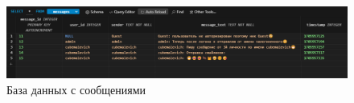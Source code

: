 \begin{enumerate}
	\begin{figure}[H]
		\centering
		\includegraphics[width=0.7\linewidth]{images/db_messages_smile}
		\caption{База данных с сообщениями}
		\label{fig:dbmessagessmile}
	\end{figure}


\end{enumerate}

